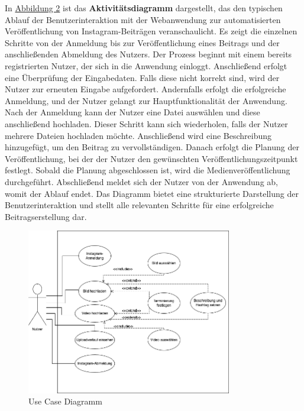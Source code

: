 In \hyperref[fig:fig-2]{Abbildung 2} ist das \textbf{Aktivitätsdiagramm} dargestellt, das den typischen Ablauf der Benutzerinteraktion mit der Webanwendung zur 
automatisierten Veröffentlichung von Instagram-Beiträgen veranschaulicht. Es zeigt die einzelnen Schritte von der Anmeldung bis zur Veröffentlichung eines Beitrags 
und der anschließenden Abmeldung des Nutzers. Der Prozess beginnt mit einem bereits registrierten Nutzer, der sich in die Anwendung einloggt. Anschließend erfolgt 
eine Überprüfung der Eingabedaten. Falls diese nicht korrekt sind, wird der Nutzer zur erneuten Eingabe aufgefordert. Andernfalls erfolgt die erfolgreiche Anmeldung, 
und der Nutzer gelangt zur Hauptfunktionalität der Anwendung. Nach der Anmeldung kann der Nutzer eine Datei auswählen und diese anschließend hochladen. Dieser Schritt 
kann sich wiederholen, falls der Nutzer mehrere Dateien hochladen möchte. Anschließend wird eine Beschreibung hinzugefügt, um den Beitrag zu vervollständigen. Danach 
erfolgt die Planung der Veröffentlichung, bei der der Nutzer den gewünschten Veröffentlichungszeitpunkt festlegt. Sobald die Planung abgeschlossen ist, wird die 
Medienveröffentlichung durchgeführt. Abschließend meldet sich der Nutzer von der Anwendung ab, womit der Ablauf endet. Das Diagramm bietet eine strukturierte 
Darstellung der Benutzerinteraktion und stellt alle relevanten Schritte für eine erfolgreiche Beitragserstellung dar.

\begin{figure}[htb]
    \centering
    \includegraphics[width=0.8\textwidth]{graphics/use_case_diagram.png}
    \caption[Use Case Diagramm]{Use Case Diagramm\footnotemark}
    \label{fig:fig-3}
\end{figure}

